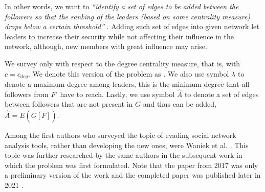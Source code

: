 In other words, we want to \emph{``identify a set of edges to be added between the followers so that
the ranking of the leaders (based on some centrality measure) drops below a certain threshold''} \cite{Waniek2017}.
Adding such set of edges into given network let leaders to increase their security while not affecting their
influence in the network, although, new members with great influence may arise.

We survey \HLshort only with respect to the degree centrality measure, that is, with $c = c_{deg}$.
We denote this version of the problem as \HLdeg.
We also use symbol $\lambda$ to denote a maximum degree among leaders, this is the minimum degree that
all followers from $F'$ have to reach.
Lastly, we use symbol $\hat{A}$ to denote a set of edges between followers that are not present in $G$ and thus can be added,
$\hat{A} = E(\overline{G[F]})$.

Among the first authors who surveyed the topic of evading social network analysis tools, rather than developing the new ones,
were Waniek et al. \cite[y.~2016]{Waniek2016}.
This topic was further researched by the same authors in the subsequent work \cite[y.~2017]{Waniek2017}
in which the \HL problem was first formulated.
Note that the paper from 2017 was only a preliminary version of the work and the completed paper was
published later in 2021 \cite[y.~2021]{Waniek2021}.

